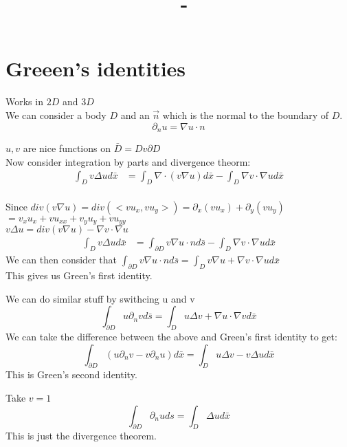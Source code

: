 \documentclass[answers,12pt,addpoints]{exam}
\author{\name}
\title{\course \ - \assignment}
\begin{document}
\maketitle
\section*{Greeen's identities}
Works in $2D$ and $3D$\\
We can consider a body $D$ and an $\vec{n}$ which is the normal to the boundary of $D$.\\
$$\partial_n u = \nabla u \cdot n$$

$u,v$ are nice functions on $\bar{D} = Dv \partial D$\\
Now consider integration by parts and divergence theorm:
\begin{align*}
    \int_D v \Delta u d\bar{x} &= \int_D \nabla \cdot (v \nabla u) d\bar{x} - \int_D \nabla v \cdot \nabla u d\bar{x}\\
\end{align*}
\begin{theorem}
    Since $div(v \nabla u) = div(<v u_x, v u_y>) = \partial_x(v u_x) + \partial_y(v u_y)$\\
    $ = v_x u_x + v u_{xx} + v_y u_y + v u_{yy}$\\
    $ v \Delta u = div(v \nabla u) - \nabla v \cdot \nabla u$\\
\begin{align*}
    \int_D v \Delta u d\bar{x} &= \int_{\partial D} v \nabla u \cdot n d\bar{s} - \int_D \nabla v \cdot \nabla u d\bar{x}
\end{align*}
We can then consider that $\int_{\partial D} v \nabla u \cdot n d\bar{s} = \int_{D} v \nabla u + \nabla v \cdot \nabla u d\bar{x}$\\
This gives us Green's first identity.
\end{theorem}
\begin{theorem}
    We can do similar stuff by swithcing u and v\\
    $$\int_{\partial D} u \partial_n v d\bar{s} = \int_D u \Delta v  + \nabla u \cdot \nabla v d\bar{x}$$
    We can take the difference between the above and Green's first identity to get:
    $$\int_{\partial D} (u \partial_n v - v \partial_n u) d\bar{x} = \int_{D} u \Delta v - v \Delta u d\bar{x}$$
    This is Green's second identity.
\end{theorem}
\begin{example}
    Take $v= 1$\\
    $$\int_{\partial D} \partial_n u ds = \int_{D} \Delta u d\bar{x}$$
    This is just the divergence theorem.
\end{example}
\end{document}
